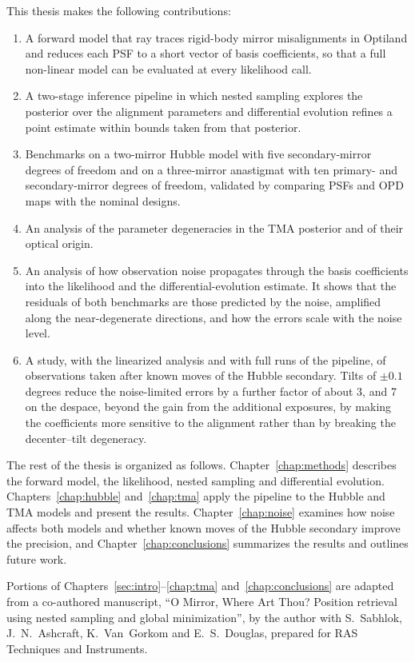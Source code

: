 This thesis makes the following contributions:
\begin{enumerate}
    \item A forward model that ray traces rigid-body mirror misalignments in Optiland and reduces each PSF to a short vector of basis coefficients, so that a full non-linear model can be evaluated at every likelihood call.
    \item A two-stage inference pipeline in which nested sampling explores the posterior over the alignment parameters and differential evolution refines a point estimate within bounds taken from that posterior.
    \item Benchmarks on a two-mirror Hubble model with five secondary-mirror degrees of freedom and on a three-mirror anastigmat with ten primary- and secondary-mirror degrees of freedom, validated by comparing PSFs and OPD maps with the nominal designs.
    \item An analysis of the parameter degeneracies in the TMA posterior and of their optical origin.
    \item An analysis of how observation noise propagates through the basis coefficients into the likelihood and the differential-evolution estimate. It shows that the residuals of both benchmarks are those predicted by the noise, amplified along the near-degenerate directions, and how the errors scale with the noise level.
    \item A study, with the linearized analysis and with full runs of the pipeline, of observations taken after known moves of the Hubble secondary. Tilts of $\pm0.1$ degrees reduce the noise-limited errors by a further factor of about 3, and 7 on the despace, beyond the gain from the additional exposures, by making the coefficients more sensitive to the alignment rather than by breaking the decenter--tilt degeneracy.
\end{enumerate}

The rest of the thesis is organized as follows. Chapter~\ref{chap:methods} describes the forward model, the likelihood, nested sampling and differential evolution. Chapters~\ref{chap:hubble} and~\ref{chap:tma} apply the pipeline to the Hubble and TMA models and present the results. Chapter~\ref{chap:noise} examines how noise affects both models and whether known moves of the Hubble secondary improve the precision, and Chapter~\ref{chap:conclusions} summarizes the results and outlines future work.

Portions of Chapters~\ref{sec:intro}--\ref{chap:tma} and~\ref{chap:conclusions} are adapted from a co-authored manuscript, ``O Mirror, Where Art Thou? Position retrieval using nested sampling and global minimization'', by the author with S.~Sabhlok, J.~N.~Ashcraft, K.~Van~Gorkom and E.~S.~Douglas, prepared for RAS Techniques and Instruments.
